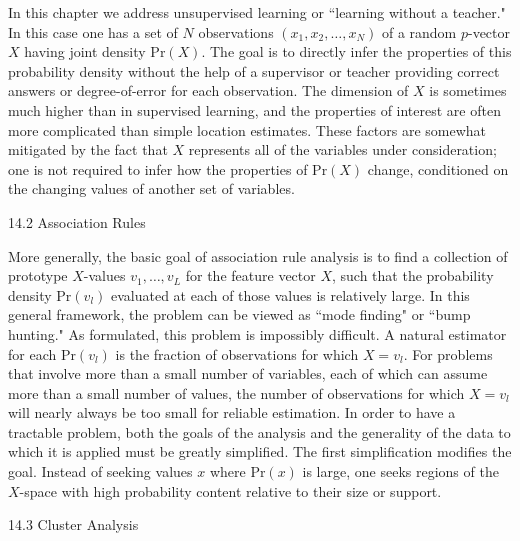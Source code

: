 In this chapter we address unsupervised learning or ``learning without a teacher." In this case one has a set of $N$ observations $(x_1,x_2,\dots ,x_N)$ of a random $p$-vector $X$ having joint density $\text{Pr}(X)$. The goal is to directly infer the properties of this probability density without the help of a supervisor or teacher providing correct answers or degree-of-error for each observation. The dimension of $X$ is sometimes much higher than in supervised learning, and the properties of interest are often more complicated than simple location estimates. These factors are somewhat mitigated by the fact that $X$ represents all of the variables under consideration; one is not required to infer how the properties of $\text{Pr}(X)$ change, conditioned on the changing values of another set of variables.

14.2 Association Rules

More generally, the basic goal of association rule analysis is to find a collection of prototype $X$-values $v_1,\dots ,v_L$ for the feature vector $X$, such that the probability density $\text{Pr}(v_l)$ evaluated at each of those values is relatively large. In this general framework, the problem can be viewed as ``mode finding" or ``bump hunting." As formulated, this problem is impossibly difficult. A natural estimator for each $\text{Pr}(v_l)$ is the fraction of observations for which $X=v_l$. For problems that involve more than a small number of variables, each of which can assume more than a small number of values, the number of observations for which $X=v_l$ will nearly always be too small for reliable estimation. In order to have a tractable problem, both the goals of the analysis and the generality of the data to which it is applied must be greatly simplified. The first simplification modifies the goal. Instead of seeking values $x$ where $\text{Pr}(x)$ is large, one seeks regions of the $X$-space with high probability content relative to their size or support.

14.3 Cluster Analysis


